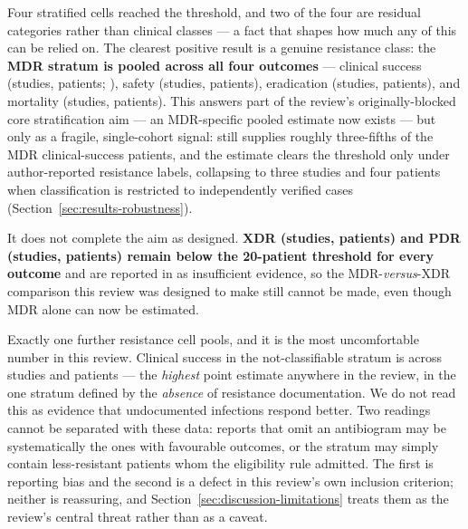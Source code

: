 Four stratified cells reached the threshold, and two of the four are residual categories rather than clinical classes --- a fact that shapes how much any of this can be relied on. The clearest positive result is a genuine resistance class: the \textbf{MDR stratum is pooled across all four outcomes} --- clinical success \CsResMDREstCI (\CsResMDRK studies, \CsResMDRN patients; ), safety \SafResMDREstCI (\SafResMDRK studies, \SafResMDRN patients), eradication \EradResMDREstCI (\EradResMDRK studies, \EradResMDRN patients), and mortality \MortResMDREstCI (\MortResMDRK studies, \MortResMDRN patients). This answers part of the review's originally-blocked core stratification aim --- an MDR-specific pooled estimate now exists --- but only as a fragile, single-cohort signal: \citeauthor{Pirnay2024_natmicrobiol} still supplies roughly three-fifths of the MDR clinical-success patients, and the estimate clears the threshold only under author-reported resistance labels, collapsing to three studies and four patients when classification is restricted to independently verified cases (Section~\ref{sec:results-robustness}).

It does not complete the aim as designed. \textbf{XDR (\CsResXDRK studies, \CsResXDRN patients) and PDR (\CsResPDRK studies, \CsResPDRN patients) remain below the 20-patient threshold for every outcome} and are reported in  as insufficient evidence, so the MDR-\emph{versus}-XDR comparison this review was designed to make still cannot be made, even though MDR alone can now be estimated.

Exactly one further resistance cell pools, and it is the most uncomfortable number in this review. Clinical success in the not-classifiable stratum is \CsResNotClassifiableEstCI across \CsResNotClassifiableK studies and \CsResNotClassifiableN patients --- the \emph{highest} point estimate anywhere in the review, in the one stratum defined by the \emph{absence} of resistance documentation. We do not read this as evidence that undocumented infections respond better. Two readings cannot be separated with these data: reports that omit an antibiogram may be systematically the ones with favourable outcomes, or the stratum may simply contain less-resistant patients whom the eligibility rule admitted. The first is reporting bias and the second is a defect in this review's own inclusion criterion; neither is reassuring, and Section~\ref{sec:discussion-limitations} treats them as the review's central threat rather than as a caveat.

